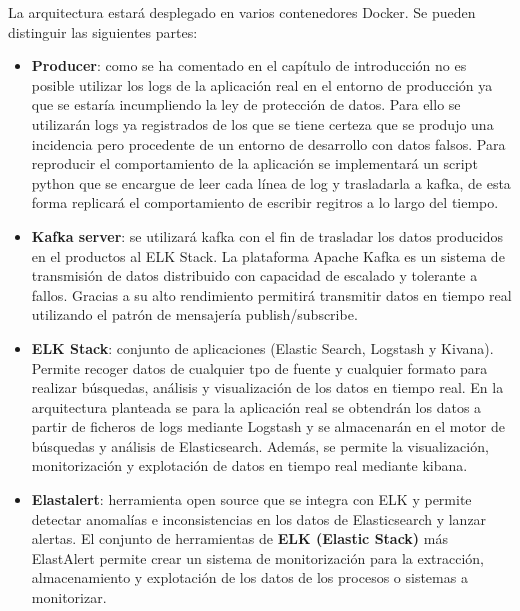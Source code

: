 La arquitectura estará desplegado en varios contenedores Docker. Se pueden distinguir las siguientes partes:

\begin{itemize}
\item \textbf{Producer}: como se ha comentado en el capítulo de introducción no es posible utilizar los logs de la aplicación real en el entorno de producción ya que se estaría incumpliendo la ley de protección de datos. Para ello se utilizarán logs ya registrados de los que se tiene certeza que se produjo una incidencia pero procedente de un entorno de desarrollo con datos falsos. Para reproducir el comportamiento de la aplicación se implementará un script python que se encargue de leer cada línea de log y trasladarla a kafka, de esta forma replicará el comportamiento de escribir regitros a lo largo del tiempo.

\item \textbf{Kafka server}: se utilizará kafka con el fin de trasladar los datos producidos en el productos al ELK Stack. La plataforma Apache Kafka es un sistema de transmisión de datos distribuido con capacidad de escalado y tolerante a fallos. Gracias a su alto rendimiento permitirá transmitir datos en tiempo real utilizando el patrón de mensajería publish/subscribe. 

\item \textbf{ELK Stack}: conjunto de aplicaciones (Elastic Search, Logstash y Kivana). Permite recoger datos de cualquier tpo de fuente y cualquier formato para realizar búsquedas, análisis y visualización de los datos en tiempo real. En la arquitectura planteada se para la aplicación real se obtendrán los datos a partir de ficheros de logs mediante Logstash y se almacenarán en el motor de búsquedas y análisis de Elasticsearch. Además, se permite la visualización, monitorización y explotación de datos en tiempo real mediante kibana.

\item \textbf{Elastalert}: herramienta open source que se integra con ELK y permite detectar anomalías e inconsistencias en los datos de Elasticsearch y lanzar alertas. El conjunto de herramientas de \textbf{ELK (Elastic Stack)} más ElastAlert permite crear un sistema de monitorización para la extracción, almacenamiento y explotación de los datos de los procesos o sistemas a monitorizar.

\end{itemize}
